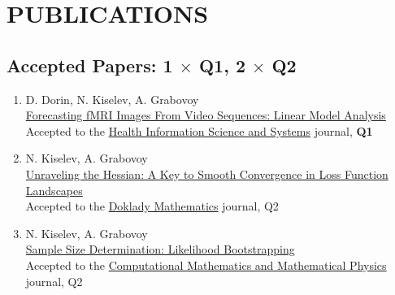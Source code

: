 \documentclass[11pt,a4paper]{moderncv}
\begin{document}


\section{PUBLICATIONS}
\subsection{Accepted Papers: 1 $\times$ Q1, 2 $\times$ Q2}
\begin{enumerate}%
    \item D. Dorin, N. Kiselev, A. Grabovoy\\
    \href{https://github.com/DorinDaniil/Forecasting-fMRI-Images}{Forecasting fMRI Images From Video Sequences: Linear Model Analysis}\\
    Accepted to the \href{https://link.springer.com/journal/13755}{Health Information Science and Systems} journal, \textbf{Q1}
    \item N. Kiselev, A. Grabovoy\\
    \href{https://arxiv.org/abs/2409.11995}{Unraveling the Hessian: A Key to Smooth Convergence in Loss Function Landscapes}\\
    Accepted to the \href{https://link.springer.com/journal/11472}{Doklady Mathematics} journal, Q2
    \item N. Kiselev, A. Grabovoy\\
    \href{https://github.com/kisnikser/Likelihood-Bootstrapping}{Sample Size Determination: Likelihood Bootstrapping}\\
    Accepted to the \href{https://link.springer.com/journal/11470}{Computational Mathematics and Mathematical Physics} journal, Q2
\end{enumerate}
\end{document}
